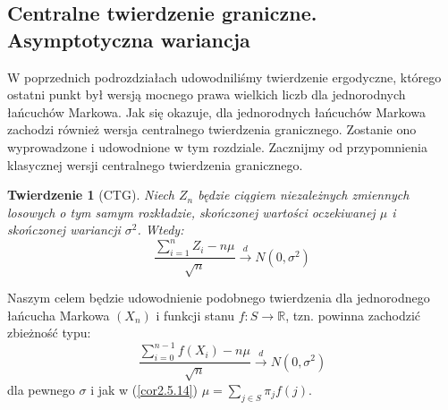 \documentclass[a4paper]{article}
\theoremstyle{defn}
\theoremstyle{theorem}
\newtheorem{theorem}[defn]{Twierdzenie}
\theoremstyle{lemma}
\theoremstyle{cor}
\theoremstyle{fact}
\begin{document}
\subsection{Centralne twierdzenie graniczne. Asymptotyczna wariancja}
\label{sect2.6}
W poprzednich podrozdziałach udowodniliśmy twierdzenie ergodyczne, którego ostatni punkt był wersją mocnego prawa wielkich liczb dla jednorodnych łańcuchów Markowa. Jak się okazuje, dla jednorodnych łańcuchów Markowa zachodzi również wersja centralnego twierdzenia granicznego. Zostanie ono wyprowadzone i udowodnione w tym rozdziale. Zacznijmy od przypomnienia klasycznej wersji centralnego twierdzenia granicznego.\\

\begin{theorem}[CTG]\label{theorem2.6.1}
Niech $Z_n$ będzie ciągiem niezależnych zmiennych losowych o tym samym rozkładzie, skończonej wartości oczekiwanej $\mu$ i skończonej wariancji $\sigma^2$. Wtedy:
$$\frac{\sum\limits_{i=1}^n Z_i - n\mu}{\sqrt{n}} \overset{d}{\to} N(0, \sigma^2)$$
\end{theorem}
Naszym celem będzie udowodnienie podobnego twierdzenia dla jednorodnego łańcucha Markowa $(X_n)$ i funkcji stanu $f: S \to \mathbb{R}$, tzn. powinna zachodzić zbieżność typu:
$$ \frac{\sum\limits_{i=0}^{n-1} f(X_i) - n\mu}{\sqrt{n}} \overset{d}{\to} N(0, \sigma^2)$$
dla pewnego $\sigma$ i jak w (\ref{cor2.5.14}) $\mu = \sum\limits_{j \in S} \pi_j f(j)$. 
\end{document}
